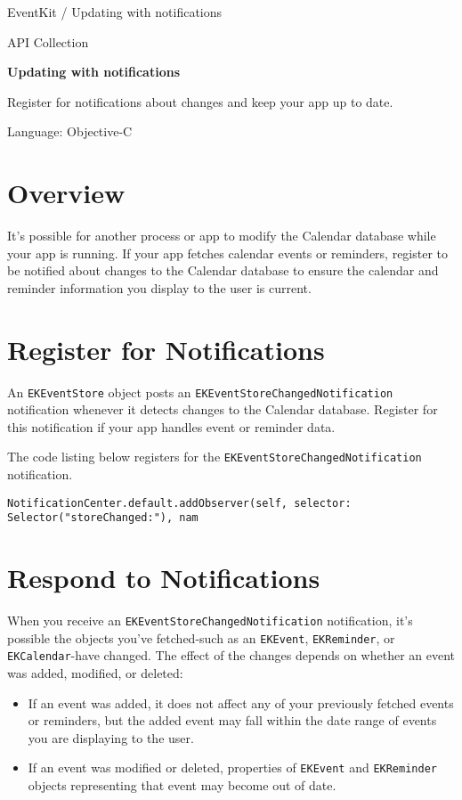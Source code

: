 \documentclass{article}
\title{}
\author{}
\date{}
\begin{document}
EventKit / Updating with notifications

API Collection

\textbf{Updating with notifications}

Register for notifications about changes and keep your app up to date.

Language: Objective-C

\section*{Overview}

It's possible for another process or app to modify the Calendar database while your app is running. If your app
fetches calendar events or reminders, register to be notified about changes to the Calendar database to ensure
the calendar and reminder information you display to the user is current.

\section*{Register for Notifications}

An \texttt{EKEventStore} object posts an \texttt{EKEventStoreChangedNotification} notification whenever it detects
changes to the Calendar database. Register for this notification if your app handles event or reminder data.

The code listing below registers for the \texttt{EKEventStoreChangedNotification} notification.

\texttt{NotificationCenter.default.addObserver(self, selector: Selector("storeChanged:"), nam}

\section*{Respond to Notifications}

When you receive an \texttt{EKEventStoreChangedNotification} notification, it's possible the objects you've
fetched-such as an \texttt{EKEvent}, \texttt{EKReminder}, or \texttt{EKCalendar}-have changed. The effect of the changes
depends on whether an event was added, modified, or deleted:

\begin{itemize}
    \item If an event was added, it does not affect any of your previously fetched events or reminders, but the added
    event may fall within the date range of events you are displaying to the user.
    \item If an event was modified or deleted, properties of \texttt{EKEvent} and \texttt{EKReminder} objects representing that event
    may become out of date.
\end{itemize}
\end{document}
